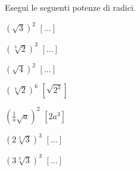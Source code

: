 \begin{esercizio}[\Ast]
 \label{ese:2.46}
Esegui le seguenti potenze di radici.
 \begin{multicols}{4}
 \begin{enumeratea}
 \item $\left(\sqrt 3\right)^2$
  \hfill $\left[...\right]$
 \item $\left(\sqrt[3]2\right)^3$
  \hfill $\left[...\right]$
 \item $\left(\sqrt 4\right)^2$
  \hfill $\left[...\right]$
 \item $\left(\sqrt[4]2\right)^6$
  \hfill $\left[\sqrt{2^3}\right]$
 \item $\left(\frac 1 a\sqrt a\right)^2$
  \hfill $\left[2a^3\right]$
 \item $\left(2\sqrt[3]3\right)^3$
  \hfill $\left[...\right]$
 \item $\left(3\sqrt[3]3\right)^3$
  \hfill $\left[...\right]$

\end{enumeratea}
\end{multicols}
\end{esercizio}
